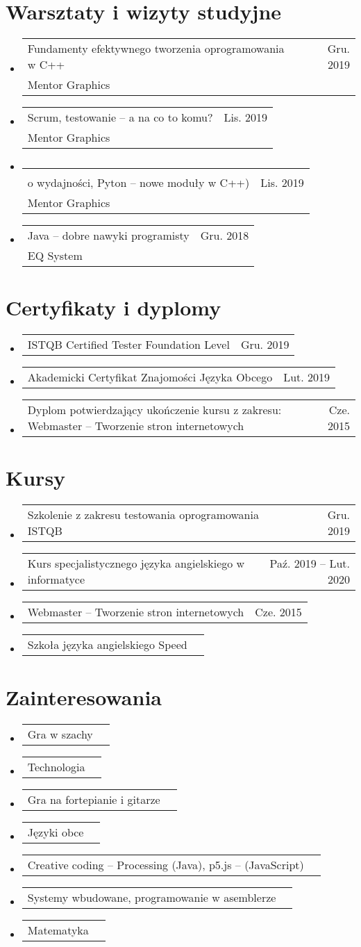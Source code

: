 \documentclass[A4,11pt]{article}
\makeatletter
\newcommand{\Course}[3]{
  \item
    \begin{tabular*}{0.97\textwidth}[t]{l@{\extracolsep{\fill}}r}
      {\setstretch{0.6}#1} & #2 \\
      \small #3 \\
    \end{tabular*}\vspace{4pt}
}
\newcommand{\CVSubSubheading}[2]{
  \item
    \begin{tabular*}{0.97\textwidth}{l@{\extracolsep{\fill}}r}
      \small#1 & \small #2 \\
    \end{tabular*}\vspace{-4pt}
}
\newcommand{\CVSubHeadingListStart}{\begin{itemize}[leftmargin=0.5cm, label={}]}
\newcommand{\CVSubHeadingListEnd}{\end{itemize}}
\makeatother
\begin{document}
\section{Warsztaty i wizyty studyjne}
  \CVSubHeadingListStart
    \Course
      {Fundamenty efektywnego tworzenia oprogramowania w C++}{Gru. 2019}
      {Mentor Graphics}
    \Course
      {Scrum, testowanie -- a na co to komu?}{Lis. 2019}
      {Mentor Graphics}
    \Course
      {\makecell[l]{"Be quick or be dead" (Szyfrowanie stosowane, Programowanie w C++ z myślą\\o wydajności, Pyton -- nowe moduły w C++)}}{Lis. 2019}
      {Mentor Graphics}
    \Course
      {Java -- dobre nawyki programisty}{Gru. 2018}
      {EQ System}
  \CVSubHeadingListEnd

\section{Certyfikaty i dyplomy}
  \CVSubHeadingListStart
    \CVSubSubheading{ISTQB Certified Tester Foundation Level}{Gru. 2019}
    \CVSubSubheading{Akademicki Certyfikat Znajomości Języka Obcego}{Lut. 2019}
    \CVSubSubheading{Dyplom potwierdzający ukończenie kursu z zakresu: Webmaster -- Tworzenie stron internetowych}{Cze. 2015}
  \CVSubHeadingListEnd

\section{Kursy}
  \CVSubHeadingListStart
    \CVSubSubheading{Szkolenie z zakresu testowania oprogramowania ISTQB}{Gru. 2019}
    \CVSubSubheading{Kurs specjalistycznego języka angielskiego w informatyce}{Paź. 2019 -- Lut. 2020}
    \CVSubSubheading{Webmaster -- Tworzenie stron internetowych}{Cze. 2015}
    \CVSubSubheading{Szkoła języka angielskiego Speed}{}
  \CVSubHeadingListEnd
\section{Zainteresowania}
  \CVSubHeadingListStart
    \CVSubSubheading{Gra w szachy}{}
    \CVSubSubheading{Technologia}{}
    \CVSubSubheading{Gra na fortepianie i gitarze}{}
    \CVSubSubheading{Języki obce}{}
    \CVSubSubheading{Creative coding -- Processing (Java), p5.js -- (JavaScript)}{}
    \CVSubSubheading{Systemy wbudowane, programowanie w asemblerze}{}
    \CVSubSubheading{Matematyka}{}
  \CVSubHeadingListEnd
\end{document}
